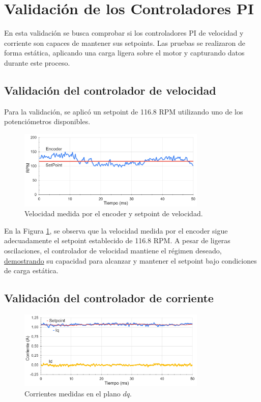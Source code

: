 \documentclass[11pt]{report}
\begin{document}
\newpage
\section{Validación de los Controladores PI}
En esta validación se busca comprobar si los controladores PI de velocidad y corriente son capaces de mantener sus setpoints. Las pruebas se realizaron de forma estática, aplicando una carga ligera sobre el motor y capturando datos durante este proceso.

\subsection{Validación del controlador de velocidad}
Para la validación, se aplicó un setpoint de 116.8 RPM utilizando uno de los potenciómetros disponibles.

\begin{figure}[ht]
	\centering
	\includegraphics[width=0.8\textwidth]{imagenes/graficas/CV.png}
	\caption{Velocidad medida por el encoder y setpoint de velocidad.}
	\label{velocidad_encoder}
\end{figure}
\FloatBarrier

En la Figura \ref{velocidad_encoder}, se observa que la velocidad medida por el encoder sigue adecuadamente el setpoint establecido de 116.8 RPM. A pesar de ligeras oscilaciones, el controlador de velocidad mantiene el régimen deseado, \href{https://www.youtube.com/watch?v=B8VR5mQcgjI}{demostrando} su capacidad para alcanzar y mantener el setpoint bajo condiciones de carga estática.

\newpage
\subsection{Validación del controlador de corriente}

\begin{figure}[ht]
	\centering
	\includegraphics[width=0.8\textwidth]{imagenes/graficas/CV_CC.png}
	\caption{Corrientes medidas en el plano $dq$.}
	\label{cont_corrientes_dq}
\end{figure}
\FloatBarrier
\end{document}
